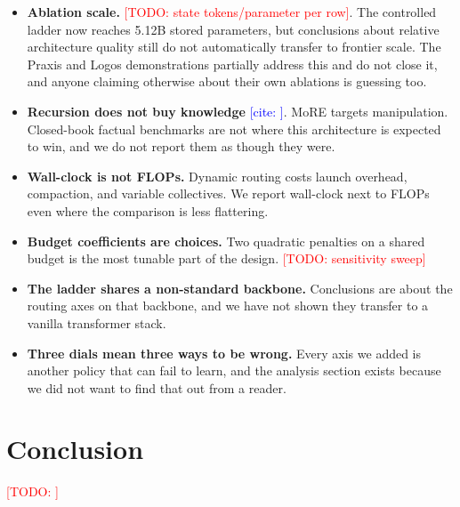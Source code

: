 \documentclass[11pt]{article}
\newcommand{\TODO}[1]{\textcolor{red}{[TODO: #1]}}
\newcommand{\CITE}[1]{\textcolor{blue}{[cite: \detokenize{#1}]}}
\begin{document}
\begin{itemize}
\item \textbf{Ablation scale.} \TODO{state tokens/parameter per row}. The
controlled ladder now reaches 5.12B stored parameters, but conclusions about
relative architecture quality still do not automatically transfer to frontier
scale. The Praxis and Logos demonstrations partially address this and do not
close it, and anyone claiming otherwise about their own ablations is guessing too.
\item \textbf{Recursion does not buy knowledge} \CITE{ouro2025}. MoRE targets
manipulation. Closed-book factual benchmarks are not where this architecture is
expected to win, and we do not report them as though they were.
\item \textbf{Wall-clock is not FLOPs.} Dynamic routing costs launch overhead,
compaction, and variable collectives. We report wall-clock next to FLOPs even
where the comparison is less flattering.
\item \textbf{Budget coefficients are choices.} Two quadratic penalties on a
shared budget is the most tunable part of the design. \TODO{sensitivity sweep}
\item \textbf{The ladder shares a non-standard backbone.} Conclusions are about
the routing axes on that backbone, and we have not shown they transfer to a
vanilla transformer stack.
\item \textbf{Three dials mean three ways to be wrong.} Every axis we added is
another policy that can fail to learn, and the analysis section exists because we
did not want to find that out from a reader.
\end{itemize}

\section{Conclusion}
\TODO{}



\end{document}
